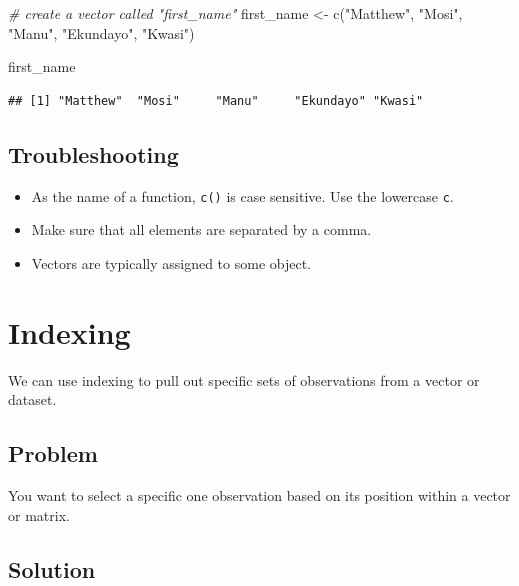 \documentclass[
]{book}
\newenvironment{Shaded}{\begin{snugshade}}{\end{snugshade}}
\newcommand{\CommentTok}[1]{\textcolor[rgb]{0.56,0.35,0.01}{\textit{#1}}}
\newcommand{\FunctionTok}[1]{\textcolor[rgb]{0.00,0.00,0.00}{#1}}
\newcommand{\NormalTok}[1]{#1}
\newcommand{\OtherTok}[1]{\textcolor[rgb]{0.56,0.35,0.01}{#1}}
\newcommand{\StringTok}[1]{\textcolor[rgb]{0.31,0.60,0.02}{#1}}
\providecommand{\tightlist}{%
  \setlength{\itemsep}{0pt}\setlength{\parskip}{0pt}}
\begin{document}
\begin{Shaded}
\begin{Highlighting}[]
\CommentTok{\# create a vector called "first\_name"}
\NormalTok{first\_name }\OtherTok{\textless{}{-}} \FunctionTok{c}\NormalTok{(}\StringTok{"Matthew"}\NormalTok{, }\StringTok{"Mosi"}\NormalTok{, }\StringTok{"Manu"}\NormalTok{, }\StringTok{"Ekundayo"}\NormalTok{, }\StringTok{"Kwasi"}\NormalTok{)}

\NormalTok{first\_name}
\end{Highlighting}
\end{Shaded}

\begin{verbatim}
## [1] "Matthew"  "Mosi"     "Manu"     "Ekundayo" "Kwasi"
\end{verbatim}

\hypertarget{troubleshooting-2}{%
\subsection{Troubleshooting}\label{troubleshooting-2}}

\begin{itemize}
\tightlist
\item
  As the name of a function, \texttt{c()} is case sensitive. Use the lowercase \texttt{c}.
\item
  Make sure that all elements are separated by a comma.
\item
  Vectors are typically assigned to some object.
\end{itemize}

\hypertarget{index}{%
\section{Indexing}\label{index}}

We can use indexing to pull out specific sets of observations from a vector or dataset.

\hypertarget{problem-3}{%
\subsection{Problem}\label{problem-3}}

You want to select a specific one observation based on its position within a vector or matrix.

\hypertarget{solution-3}{%
\subsection{Solution}\label{solution-3}}
\end{document}
